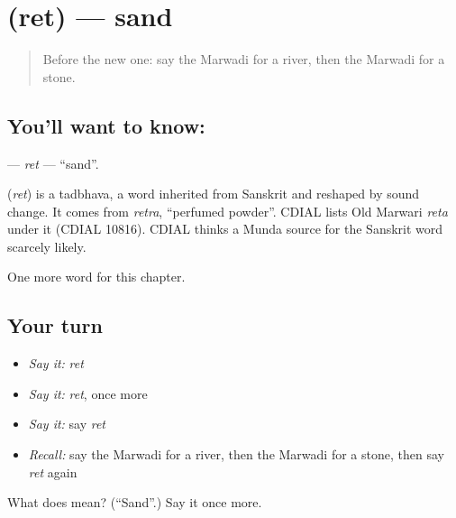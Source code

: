 \section[\texorpdfstring{\mw{रेत} (ret)}{रेत (ret)}]{ (ret) — sand}

\label{lesson:MW-C68-ret}



\begin{quote}
Before the new one: say the Marwadi for a river, then the Marwadi for a stone.
\end{quote}

\subsection*{You'll want to know: }
\textbf{} — \emph{ret} — \textquotedblleft{}sand\textquotedblright{}.

\begin{cousinweb}
\textbf{} (\emph{ret}) is a tadbhava, a word inherited from Sanskrit and reshaped by sound change. It comes from \emph{retra}, \textquotedblleft{}perfumed powder\textquotedblright{}. CDIAL lists Old Marwari \emph{reta} under it (CDIAL 10816). CDIAL thinks a Munda source for the Sanskrit word scarcely likely.
\end{cousinweb}

\begin{grammarlens}[title={What you've built}]
One more word for this chapter.
\end{grammarlens}

\subsection*{Your turn}
\begin{itemize}
\raggedright
  \item \emph{Say it:} \emph{ret}
  \item \emph{Say it:} \emph{ret}, once more
  \item \emph{Say it:} say \emph{ret}
  \item \emph{Recall:} say the Marwadi for a river, then the Marwadi for a stone, then say \emph{ret} again
\end{itemize}

\begin{tcolorbox}[breakable,colback=teal!4,colframe=teal!35!black,title={Before you move on}]
What does  mean? (\textquotedblleft{}Sand\textquotedblright{}.) Say it once more.
\end{tcolorbox}
